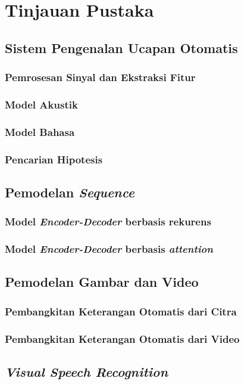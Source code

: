 \chapter{Tinjauan Pustaka}

\section{Sistem Pengenalan Ucapan Otomatis}

\subsection{Pemrosesan Sinyal dan Ekstraksi Fitur}

\subsection{Model Akustik}

\subsection{Model Bahasa}

\subsection{Pencarian Hipotesis}

\section{Pemodelan \textit{Sequence}}

\subsection{Model \textit{Encoder-Decoder} berbasis rekurens}

\subsection{Model \textit{Encoder-Decoder} berbasis \textit{attention}}

\section{Pemodelan Gambar dan Video}

\subsection{Pembangkitan Keterangan Otomatis dari Citra}

\subsection{Pembangkitan Keterangan Otomatis dari Video}

\section{\textit{Visual Speech Recognition}}